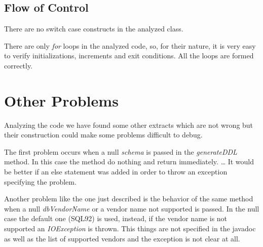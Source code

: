 \documentclass[9pt]{beamer}
\makeatletter
\newcommand*{\currentname}{\@currentlabelname}
\makeatother
\begin{document}
\subsection{Flow of Control}
\begin{frame}{\currentname}
There are no switch case constructs in the analyzed class.

There are only \emph{for} loops in the analyzed code, so, for their nature, it is very easy to verify initializations, increments and exit conditions. All the loops are formed correctly.
\end{frame}

\section{Other Problems}
\begin{frame}[allowframebreaks]{\currentname}

Analyzing the code we have found some other extracts which are not wrong but their construction could make some problems difficult to debug.

\begin{block}{}
The first problem occurs when a null \emph{schema} is passed in the \emph{generateDDL} method. In this case the method do nothing and return immediately. 
\ldots
{}
It would be better if an else statement was added in order to throw an exception specifying the problem.
\end{block}


\begin{block}{}
Another problem like the one just described is the behavior of the same method when a null \emph{dbVendorName} or a vendor name not supported is passed. In the null case the default one (SQL92) is used, instead, if the vendor name is not supported an \emph{IOException} is thrown. This things are not specified in the javadoc as well as the list of supported vendors and the exception is not clear at all.
\end{block}

\end{frame}
\end{document}
